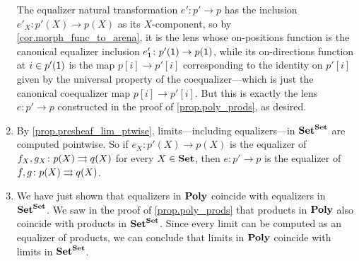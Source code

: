 \documentclass[Book-Poly]{subfiles}
\begin{document}
\begin{exercise}
\begin{solution}
\begin{enumerate}
    The equalizer natural transformation $e'\colon p'\to p$ has the inclusion $e'_X\colon p'(X)\to p(X)$ as its $X$-component, so by \cref{cor.morph_func_to_arena}, it is the lens whose on-positions function is the canonical equalizer inclusion $e'_{\textsf{1}}\colon p'(\textsf{1})\to p(\textsf{1})$, while its on-directions function at $i\in p'(\textsf{1})$ is the map $p[i]\to p'[i]$ corresponding to the identity on $p'[i]$ given by the universal property of the coequalizer---which is just the canonical coequalizer map $p[i]\to p'[i]$.
    But this is exactly the lens $e\colon p'\to p$ constructed in the proof of \cref{prop.poly_prods}, as desired.
    \item By \cref{prop.presheaf_lim_ptwise}, limits---including equalizers---in $\mathbf{Set}^{\mathbf{Set}}$ are computed pointwise.
    So if $e_X\colon p'(X)\to p(X)$ is the equalizer of $f_X,g_X\colon p(X)\rightrightarrows q(X)$ for every $X\in\mathbf{Set}$, then $e\colon p'\to p$ is the equalizer of $f,g\colon p(X)\rightrightarrows q(X)$.
    \item We have just shown that equalizers in $\mathbf{Poly}$ coincide with equalizers in $\mathbf{Set}^{\mathbf{Set}}$.
    We saw in the proof of \cref{prop.poly_prods} that products in $\mathbf{Poly}$ also coincide with products in $\mathbf{Set}^{\mathbf{Set}}$.
    Since every limit can be computed as an equalizer of products, we can conclude that limits in $\mathbf{Poly}$ coincide with limits in $\mathbf{Set}^{\mathbf{Set}}$.
\end{enumerate}
\end{solution}
\end{exercise}

\end{document}
